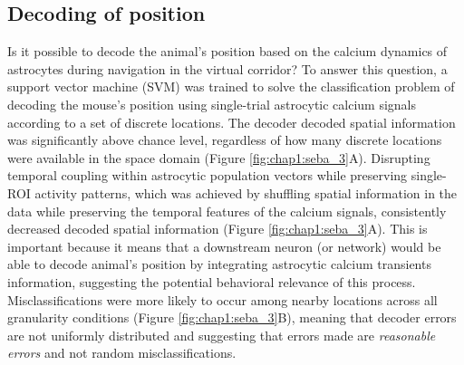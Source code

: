 \subsection{Decoding of position}
\label{chap1:sec:3:subsec3:position_decoding}
Is it possible to decode the animal's position based on the calcium dynamics of astrocytes during navigation in the virtual corridor? 
To answer this question, a support vector machine (SVM) was trained to solve the classification problem of decoding the mouse's position using single-trial astrocytic calcium signals according to a set of discrete locations. 
The decoder decoded spatial information was significantly above chance level, regardless of how many discrete locations were available in the space domain (Figure \ref{fig:chap1:seba_3}A).
Disrupting temporal coupling within astrocytic population vectors while preserving single-ROI activity patterns, which was achieved by shuffling spatial information in the data while preserving the temporal features of the calcium signals, consistently decreased decoded spatial information (Figure \ref{fig:chap1:seba_3}A).
This is important because it means that a downstream neuron (or network) would be able to decode animal's position by integrating astrocytic calcium transients information, suggesting the potential behavioral relevance of this process. 
Misclassifications were more likely to occur among nearby locations across all granularity conditions (Figure \ref{fig:chap1:seba_3}B), meaning that decoder errors are not uniformly distributed and suggesting that errors made are \textit{reasonable errors} and not random misclassifications.
